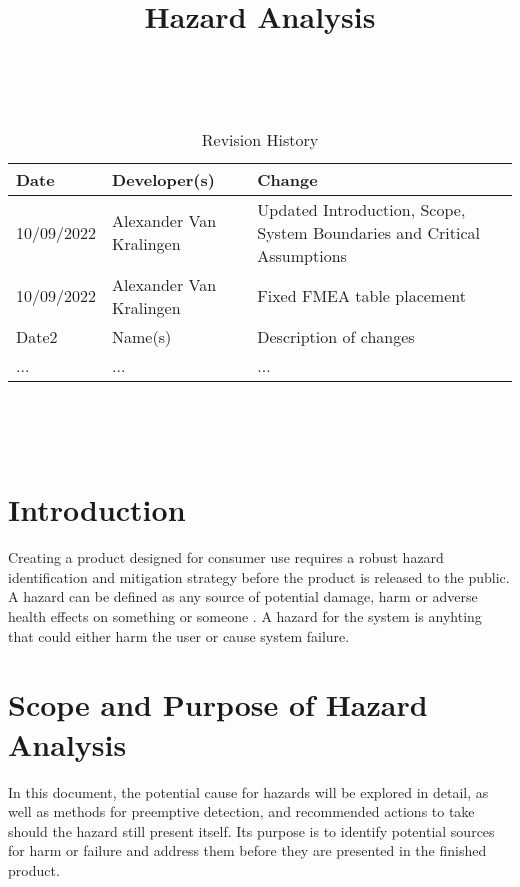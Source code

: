 \documentclass{article}
\title{Hazard Analysis\\\progname}
\author{\authname}
\date{}
\begin{document}
\maketitle
\thispagestyle{empty}

~\newpage


\begin{table}[hp]
\caption{Revision History} \label{TblRevisionHistory}
\begin{tabularx}{\textwidth}{llX}
\toprule
\textbf{Date} & \textbf{Developer(s)} & \textbf{Change}\\
\midrule
10/09/2022 & Alexander Van Kralingen & Updated Introduction, Scope, System Boundaries and Critical Assumptions\\
10/09/2022 & Alexander Van Kralingen & Fixed FMEA table placement\\
Date2 & Name(s) & Description of changes\\
... & ... & ...\\
\bottomrule
\end{tabularx}
\end{table}

~\newpage

\tableofcontents

~\newpage



\section{Introduction}{
    Creating a product designed for consumer use requires a robust hazard identification and mitigation strategy before the product is released to the public. A hazard can be defined as any source of potential damage, harm or adverse health effects on something or someone \cite{CCOHS}. A hazard for the \progname{} system is anyhting that could either harm the user or cause system failure.
}

\section{Scope and Purpose of Hazard Analysis}{
    In this document, the potential cause for hazards will be explored in detail, as well as methods for preemptive detection, and recommended actions to take should the hazard still present itself. Its purpose is to identify potential sources for harm or failure and address them before they are presented in the finished product.
}
\end{document}

